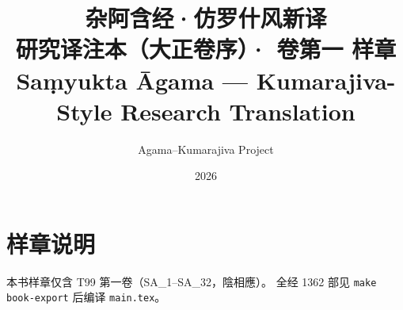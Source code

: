 \documentclass[UTF8, zihao=-4, openany, fontset=none]{ctexbook}
\title{\textbf{杂阿含经·仿罗什风新译}\\[0.5em]\large 研究译注本（大正卷序）· \textbf{卷第一 样章}\\[0.3em]\normalsize Saṃyukta Āgama — Kumarajiva-Style Research Translation}
\author{Agama–Kumarajiva Project}
\date{2026}
\begin{document}
\frontmatter
\maketitle
\tableofcontents
\clearpage






\mainmatter


\backmatter
\chapter*{样章说明}
\noindent 本书样章仅含 T99 第一卷（SA\_1–SA\_32，陰相應）。
全经 1362 部见 \texttt{make book-export} 后编译 \texttt{main.tex}。
\end{document}
